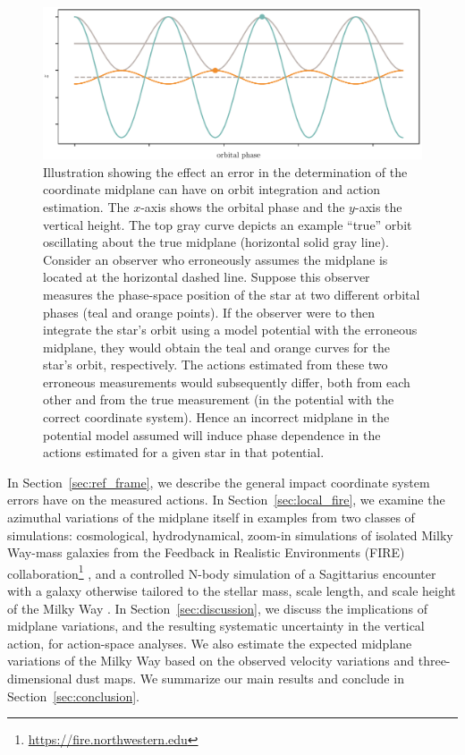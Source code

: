 \documentclass[twocolumn]{aastex62}
\begin{document}
\begin{figure}[ht!]
\begin{center}
\includegraphics[width=\textwidth]{fig/cartoon.pdf}
\end{center}
\caption{Illustration showing the effect an error in the determination
of the coordinate midplane can have on orbit integration and action
estimation. The $x$-axis shows the orbital phase and the $y$-axis the vertical
height. The top gray curve depicts an example ``true'' orbit oscillating about
the true midplane (horizontal solid gray line). Consider an observer who
erroneously assumes the midplane is located at the horizontal dashed line.
Suppose this observer measures the phase-space position of the star at two
different orbital phases (teal and orange points). If the observer were to
then integrate the star's orbit using a model potential with the erroneous
midplane, they would obtain the teal and orange curves for the star's orbit,
respectively. The actions estimated from these two erroneous measurements
would subsequently differ, both from each other and from the true measurement
(in the potential with the correct coordinate system). Hence an incorrect
midplane in the potential model assumed will induce phase dependence in the
actions estimated for a given star in that potential.} \label{fig:cartoon}
\end{figure}

In Section~\ref{sec:ref_frame}, we describe the general impact coordinate
system errors have on the measured actions. In Section~\ref{sec:local_fire},
we examine the azimuthal variations of the midplane itself in examples from
two classes of simulations: cosmological, hydrodynamical, zoom-in simulations
of isolated Milky Way-mass galaxies from the Feedback in Realistic
Environments (FIRE)
collaboration\footnote{\url{https://fire.northwestern.edu}}
\citep{2014MNRAS.445..581H, 2016ApJ...827L..23W, 2018MNRAS.480..800H}, and a
controlled N-body simulation of a Sagittarius encounter with a galaxy
otherwise tailored to the stellar mass, scale length, and scale height of the
Milky Way \citep{2018MNRAS.481..286L}. In Section~\ref{sec:discussion}, we
discuss the implications of midplane variations, and the resulting systematic
uncertainty in the vertical action, for action-space analyses. We also
estimate the expected midplane variations of the Milky Way based on the
observed velocity variations and three-dimensional dust maps. We summarize our
main results and conclude in Section~\ref{sec:conclusion}.
\end{document}
